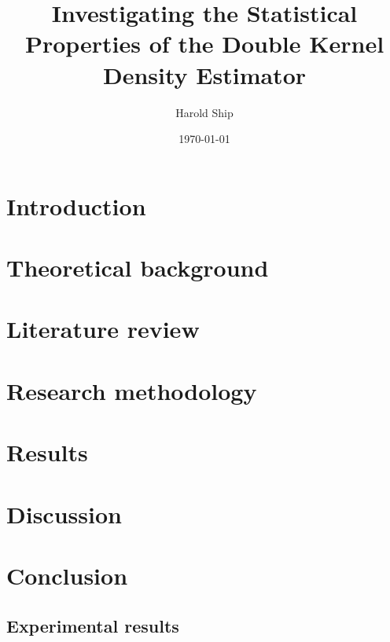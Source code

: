 \documentclass[a4paper,12pt,titlepage,twoside,openany]{book}
\title{Investigating the Statistical Properties of the Double Kernel Density Estimator}
\author{Harold Ship}
\date{\today}
\begin{document}
\frontmatter                            %
\maketitle                              %
\tableofcontents                        %

\clearpage
\listoftables
\clearpage
\listoffigures
\printglossaries

\mainmatter                             %

\chapter{Introduction}
\label{ch:introduction}


\chapter{Theoretical background}
\label{ch:theory}


\chapter{Literature review}
\label{ch:literature}


\chapter{Research methodology}
\label{ch:method}


\chapter{Results}
\label{ch:results}


\chapter{Discussion}
\label{ch:discussion}


\chapter{Conclusion}
\label{ch:conclusion}


 

\begin{appendices}
\chapter{Experimental results}
\label{ch:results_tables}

\end{appendices}
\end{document}
